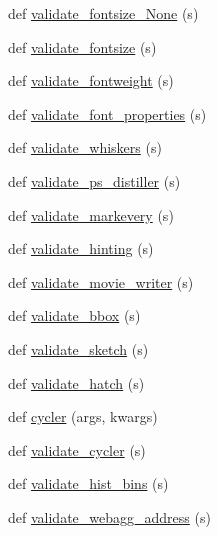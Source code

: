 \begin{DoxyCompactItemize}
\item 
def \hyperlink{namespacematplotlib_1_1rcsetup_a6e129901a8899258cc1bb3e1e3c60c1b}{validate\+\_\+fontsize\+\_\+\+None} (s)
\item 
def \hyperlink{namespacematplotlib_1_1rcsetup_a8ff8e45ef91782aa06ecb72b2e70ddbc}{validate\+\_\+fontsize} (s)
\item 
def \hyperlink{namespacematplotlib_1_1rcsetup_a8e7f271374363d2ac77d3ea251db284a}{validate\+\_\+fontweight} (s)
\item 
def \hyperlink{namespacematplotlib_1_1rcsetup_afc92d7a6e116c6ac56f9c6b52abf96e3}{validate\+\_\+font\+\_\+properties} (s)
\item 
def \hyperlink{namespacematplotlib_1_1rcsetup_aba4ae2af727777a20da263e0b2a5a722}{validate\+\_\+whiskers} (s)
\item 
def \hyperlink{namespacematplotlib_1_1rcsetup_a82acf7efd668b7ed79b8af6bf0a38aa5}{validate\+\_\+ps\+\_\+distiller} (s)
\item 
def \hyperlink{namespacematplotlib_1_1rcsetup_a8f90881deb0225046250e25b6250bf52}{validate\+\_\+markevery} (s)
\item 
def \hyperlink{namespacematplotlib_1_1rcsetup_a819dbbc11ae17186dc06f6e9d7f2d9fe}{validate\+\_\+hinting} (s)
\item 
def \hyperlink{namespacematplotlib_1_1rcsetup_a0c30d4d749e33a72b77fa26f69b7aa8f}{validate\+\_\+movie\+\_\+writer} (s)
\item 
def \hyperlink{namespacematplotlib_1_1rcsetup_a1e689ee0d30cb26166dcd26e88215e64}{validate\+\_\+bbox} (s)
\item 
def \hyperlink{namespacematplotlib_1_1rcsetup_a56cfc9be90e9670737054d1d0e4d0903}{validate\+\_\+sketch} (s)
\item 
def \hyperlink{namespacematplotlib_1_1rcsetup_a1655f90b2a492a2e6a773e4221a01f7b}{validate\+\_\+hatch} (s)
\item 
def \hyperlink{namespacematplotlib_1_1rcsetup_a29c47517d743865c566909d5807d4828}{cycler} (args, kwargs)
\item 
def \hyperlink{namespacematplotlib_1_1rcsetup_a3f7af2fd397c7c25000a09a30247abb9}{validate\+\_\+cycler} (s)
\item 
def \hyperlink{namespacematplotlib_1_1rcsetup_a9eda8d058765b27c817a645006a34fa4}{validate\+\_\+hist\+\_\+bins} (s)
\item 
def \hyperlink{namespacematplotlib_1_1rcsetup_ae71d65c136257f687958ba28aa943862}{validate\+\_\+webagg\+\_\+address} (s)
\end{DoxyCompactItemize}

